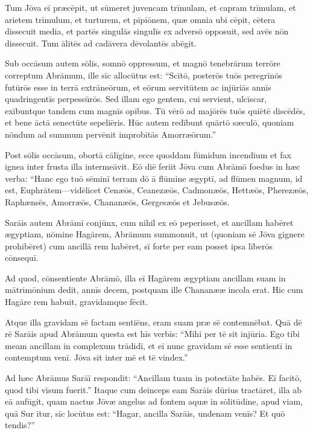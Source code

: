 \Versus Tum Jōva eī præcēpit, ut sūmeret juvencam trīmulam, et capram trīmulam, et arietem trīmulum, et turturem, et pīpiōnem,
\Versus quæ omnia ubi cēpit, cētera dissecuit media, et partēs singulās singulīs ex adversō opposuit, sed avēs nōn dissecuit.
\Versus Tum ālitēs ad cadāvera dēvolantēs abēgit.

\Versus Sub occāsum autem sōlis, somnō oppressum, et magnō tenebrārum terrōre correptum Abrāmum, ille sīc allocūtus est:
\Versus ``Scītō, posterōs tuōs peregrīnōs futūrōs esse in terrā extrāneōrum, et eōrum servitūtem ac injūriās annīs quadringentīs perpessūrōs.
\Versus Sed illam ego gentem, cui servient, ulcīscar, exībuntque tandem cum magnīs opibus.
\Versus Tū vērō ad majōrēs tuōs quiētē discēdēs, et bene āctā senectūte sepeliēris.
\Versus Hūc autem redībunt quārtō sæculō, quoniam  nōndum ad summum pervēnit improbitās Amorræōrum.''

\Versus Post sōlis occāsum, obortā cālīgine, ecce quoddam fūmidum incendium et fax ignea inter frusta illa intermeāvit.
\Versus Eō diē feriit Jōva cum Abrāmō foedus in hæc verba: ``Hanc ego tuō sēminī terram dō ā flūmine ægyptī, ad flūmen magnum, id est, Euphrātem—\Versus vidēlicet Cenæōs, Ceanezæōs, Cadmonæōs,
\Versus Hettæōs, Pherezæōs, Raphænsēs,
\Versus Amorræōs, Chananæōs, Gergesæōs et Jebusæōs.



\Caput
\Versus Sarāis autem Abrāmī conjūnx, cum nihil ex eō peperisset, et ancillam habēret ægyptiam, nōmine Hagārem,
\Versus Abrāmum summonuit, ut (quoniam sē Jōva gignere prohibēret) cum ancillā rem habēret, sī forte per eam posset ipsa līberōs cōnsequī.

Ad quod, cōnsentiente Abrāmō,
\Versus illa eī Hagārem ægyptiam ancillam suam in mātrimōnium dedit, annīs decem, postquam ille Chananææ incola erat.
\Versus Hic cum Hagāre rem habuit, gravidamque fēcit.

Atque illa gravidam sē factam sentiēns, eram suam præ sē contemnēbat.
\Versus Quā dē rē Sarāis apud Abrāmum questa est hīs verbīs: ``Mihi per tē sit injūria. Ego tibi meam ancillam in complexum trādidī, et eī nunc gravidam sē esse sentientī in contemptum venī. Jōva sit inter mē et tē vindex.''

\Versus Ad hæc Abrāmus Sarāī respondit: ``Ancillam tuam in potestāte habēs. Eī facitō, quod tibi vīsum fuerit.'' Itaque cum deinceps eam Sarāis dūrius tractāret, illa ab eā aufūgit,
\Versus quam nactus Jōvæ angelus ad fontem aquæ in sōlitūdine, apud viam, quā Sur ītur,
\Versus sīc locūtus est: ``Hagar, ancilla Sarāis, undenam venīs? Et quō tendis?''

